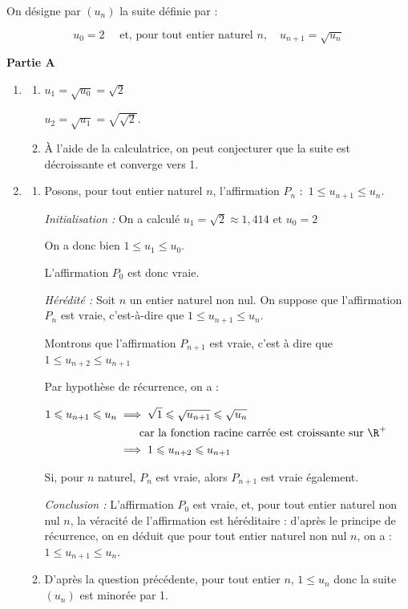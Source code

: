On désigne par $\left(u_{n}\right)$ la suite définie par :

\[u_{0}=2 \quad \text { et, pour tout entier naturel } n,\quad  u_{n+1}=\sqrt{u_{n}}\]

\medskip

\textbf{Partie A}

\medskip

\begin{enumerate}
\item
	\begin{enumerate}
		\item 

$u_1=\sqrt{u_0}=\sqrt{2}$

$u_2=\sqrt{u_1} =\sqrt{\sqrt{2}}$.
		\item À l'aide de la calculatrice, on peut conjecturer que la suite est décroissante et converge vers 1.
	\end{enumerate}
\item
	\begin{enumerate}
		\item Posons, pour tout entier naturel $n$, l'affirmation $P_n$ :~\og $1 \leqslant u_{n+1} \leqslant u_{n}$\fg{}.\hfill

\emph{Initialisation :} On a calculé $u_1 = \sqrt{2} \approx 1,414$ et $u_0=2$

On a donc bien $1 \leqslant u_1 \leqslant u_0$.

L'affirmation $P_0$ est donc vraie.

\emph{Hérédité :} Soit $n$ un entier naturel non nul. On suppose que l'affirmation $P_n$ est vraie, c'est-à-dire que $1 \leqslant u_{n+1} \leqslant u_{n}$.

Montrons que l'affirmation $P_{n+1}$ est vraie, c'est à dire que $1 \leqslant u_{n+2} \leqslant u_{n+1}$

Par hypothèse de récurrence, on a :

$ \begin{aligned}[t]
1 \leqslant u_{n+1} \leqslant u_n
	&\implies \sqrt{1} \leqslant \sqrt{u_{n+1}} \leqslant \sqrt{u_n}\\
	&\qquad \text{car  la fonction racine carrée est croissante sur } \R^+ \\
	&\implies 1 \leqslant u_{n+2} \leqslant u_{n+1}
\end{aligned}$

Si, pour $n$ naturel, $P_n$ est vraie, alors $P_{n+1}$ est vraie également.

\emph{Conclusion :} L'affirmation $P_0$ est vraie, et, pour tout entier naturel non nul $n$, la véracité de l'affirmation est héréditaire : d'après le principe de récurrence, on en déduit que pour tout entier naturel non nul $n$, on a : $1 \leqslant u_{n+1} \leqslant u_{n}$.
	\item D'après la question précédente, pour tout entier $n$, $1\leqslant u_n$ donc la suite $\left(u_n\right)$ est minorée par 1.


\end{enumerate}
\end{enumerate}
